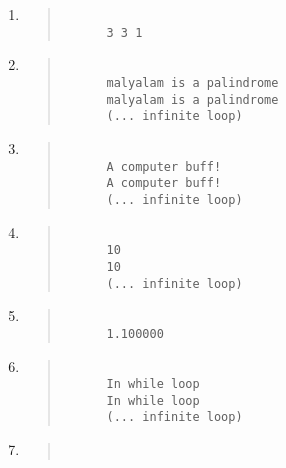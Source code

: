 \documentclass{report}
\begin{document}
\begin{enumerate}
  \item \begin{quote}
  \begin{verbatim}
      
      3 3 1
  \end{verbatim}
  \end{quote}

  \item \begin{quote}
  \begin{verbatim}
      
      malyalam is a palindrome
      malyalam is a palindrome
      (... infinite loop)
  \end{verbatim}
  \end{quote}

  \item \begin{quote}
  \begin{verbatim}
      
      A computer buff!
      A computer buff!
      (... infinite loop)
  \end{verbatim}
  \end{quote}

  \item \begin{quote}
  \begin{verbatim}
      
      10
      10
      (... infinite loop)
  \end{verbatim}
  \end{quote}

  \item \begin{quote}
  \begin{verbatim}
      
      1.100000
  \end{verbatim}
  \end{quote}

  \item \begin{quote}
  \begin{verbatim}
      
      In while loop
      In while loop
      (... infinite loop)
  \end{verbatim}
  \end{quote}

  \item \begin{quote}
  \begin{verbatim}
      

\end{verbatim}
\end{quote}
\end{enumerate}
\end{document}
